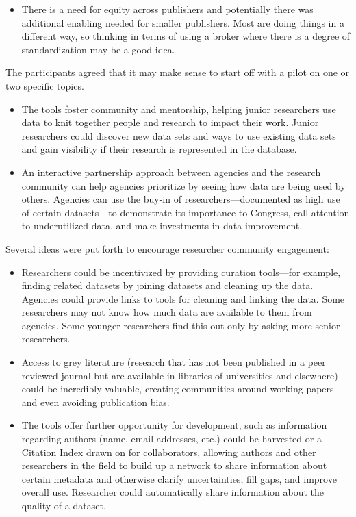 \documentclass[titlepage, 11pt]{article}
\begin{document}
{\begin{itemize}
    \item There is a need for equity across publishers and potentially there was additional enabling needed for smaller publishers. Most are doing things in a different way, so thinking in terms of using a broker where there is a degree of standardization may be a good idea.
\end{itemize}

The participants agreed that it may make sense to start off with a pilot on one or two specific topics.
\begin{itemize}
    \item The tools foster community and mentorship, helping junior researchers use data to knit together people and research to impact their work. Junior researchers could discover new data sets and ways to use existing data sets and gain visibility if their research is represented in the database. 
    \item An interactive partnership approach between agencies and the research community can help agencies prioritize by seeing how data are being used by others. Agencies can use the buy-in of researchers—documented as high use of certain datasets—to demonstrate its importance to Congress, call attention to underutilized data, and make investments in data improvement.

\end{itemize}

Several ideas were put forth to encourage researcher community engagement:

\begin{itemize}
    \item Researchers could be incentivized by providing curation tools—for example, finding related datasets by joining datasets and cleaning up the data. Agencies could provide links to tools for cleaning and linking the data. Some researchers may not know how much data are available to them from agencies. Some younger researchers find this out only by asking more senior researchers. 
    \item Access to grey literature (research that has not been published in a peer reviewed journal but are available in libraries of universities and elsewhere) could be incredibly valuable, creating communities around working papers and even avoiding publication bias. 
    \item The tools offer further opportunity for development, such as information regarding authors (name, email addresses, etc.) could be harvested or a Citation Index drawn on for collaborators, allowing authors and other researchers in the field to build up a network to share information about certain metadata and otherwise clarify uncertainties, fill gaps, and improve overall use. Researcher could automatically share information about the quality of a dataset.


\end{itemize}}
\end{document}
